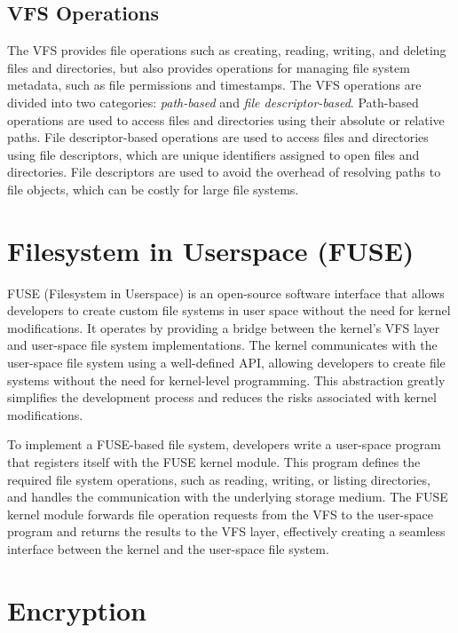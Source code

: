\subsection{VFS Operations}\label{subsec:vfs-operations}

The VFS provides file operations such as creating, reading, writing, and deleting files and directories, but also provides operations for managing file system metadata, such as file permissions and timestamps.
The VFS operations are divided into two categories: \textit{path-based} and \textit{file descriptor-based}.
Path-based operations are used to access files and directories using their absolute or relative paths.
File descriptor-based operations are used to access files and directories using file descriptors, which are unique identifiers assigned to open files and directories.
File descriptors are used to avoid the overhead of resolving paths to file objects, which can be costly for large file systems.

\section{Filesystem in Userspace (FUSE)}\label{sec:filesystem-in-userspace-(fuse)}

FUSE (Filesystem in Userspace) is an open-source software interface that allows developers to create custom file systems in user space without the need for kernel modifications.
It operates by providing a bridge between the kernel's VFS layer and user-space file system implementations.
The kernel communicates with the user-space file system using a well-defined API, allowing developers to create file systems without the need for kernel-level programming.
This abstraction greatly simplifies the development process and reduces the risks associated with kernel modifications.

To implement a FUSE-based file system, developers write a user-space program that registers itself with the FUSE kernel module.
This program defines the required file system operations, such as reading, writing, or listing directories, and handles the communication with the underlying storage medium.
The FUSE kernel module forwards file operation requests from the VFS to the user-space program and returns the results to the VFS layer, effectively creating a seamless interface between the kernel and the user-space file system.

\section{Encryption}\label{sec:encryption-approaches}

